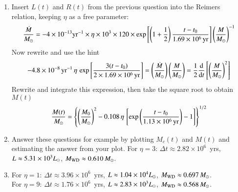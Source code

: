 \documentclass[11pt,a4paper,fleqn]{report}
\begin{document}
\begin{enumerate}
  \begin{enumerate}

  \item Insert $L(t)$ and $R(t)$ from the previous question into the
    Reimers relation, keeping $\eta$ as a free parameter:
    \[ 
    \frac{\dot M}{{M}_\odot}= -4\times 10^{-13}\mathrm{yr}^{-1} \times \eta 
    \times 10^3 \times 120 \times \exp \left[ \left(1+\frac{1}{2}\right) 
      \frac{t-t_0}{1.69\times10^6\,\mathrm{yr}} \right] 
    \left( \frac{M}{{M}_\odot} \right)^{-1}
    \]
    Now rewrite and use the hint
    \[
    - 4.8\times10^{-8}\,\mathrm{yr}^{-1} \, \eta\, \exp \left[
      \frac{3(t-t_0)}{2\times1.69\times10^6\,\mathrm{yr}} \right] 
    = \left( \frac{\dot M}{{M}_\odot} \right) \left( \frac{M}{{M}_\odot} \right)
    = \frac{1}{2} \frac{\mathrm{d}}{\mathrm{d} t} 
    \left[\left( \frac{M}{{M}_\odot} \right)^2 \right]
    \]
    Rewrite and integrate this expression, then take the square root
    to obtain $M(t)$
    \[
    \frac{M(t)}{{M}_\odot} = \left\{ \left( \frac{M_0}{{M}_\odot} \right)^2 - 
      0.108\, \eta\, \left[ \exp \left(
          \frac{t-t_0}{1.13\times10^6\,\mathrm{yr}} \right) - 1 \right] 
    \right\} ^ {1/2}
    \]


  \item Answer these questions for example by plotting $M_c(t)$ and
    $M(t)$ and estimating the answer from your plot. For $\eta = 3$:
    $\Delta t \approx 2.82 \times 10^6$~yrs, $L \approx 5.31\times
    10^3 {L}_\odot$, $M_{\rm WD} \approx 0.610\,{M}_\odot$.


  \item For $\eta = 1$: $\Delta t \approx 3.96 \times 10^6$~yrs, $L
    \approx 1.04\times 10^4 {L}_\odot$, $M_{\rm WD} \approx 0.697\,{M}_\odot$. \\
    For $\eta = 9$: $\Delta t \approx 1.76 \times 10^6$~yrs, $L
    \approx 2.83\times 10^3 {L}_\odot$, $M_{\rm WD} \approx 0.568\,{M}_\odot$.

  \end{enumerate} 


\end{enumerate} 
\end{document}

